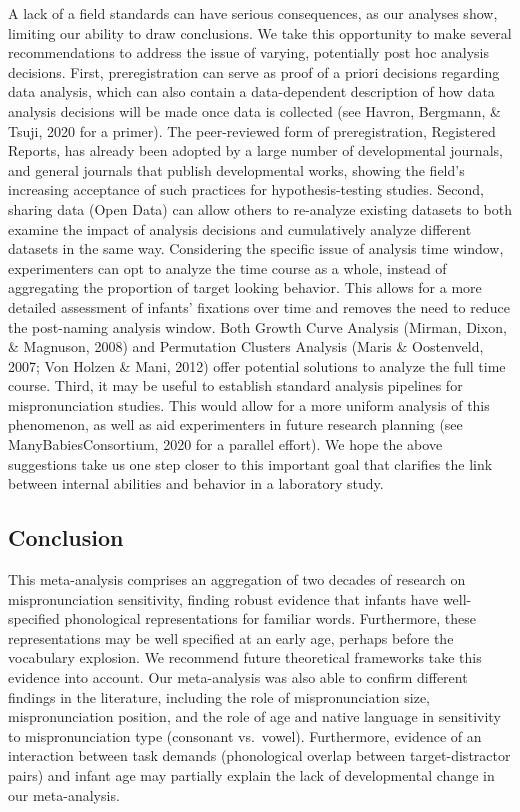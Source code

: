 \documentclass[
  man, noextraspace]{apa6}
\begin{document}
A lack of a field standards can have serious consequences, as our analyses show, limiting our ability to draw conclusions. We take this opportunity to make several recommendations to address the issue of varying, potentially post hoc analysis decisions. First, preregistration can serve as proof of a priori decisions regarding data analysis, which can also contain a data-dependent description of how data analysis decisions will be made once data is collected (see Havron, Bergmann, \& Tsuji, 2020 for a primer). The peer-reviewed form of preregistration, Registered Reports, has already been adopted by a large number of developmental journals, and general journals that publish developmental works, showing the field's increasing acceptance of such practices for hypothesis-testing studies. Second, sharing data (Open Data) can allow others to re-analyze existing datasets to both examine the impact of analysis decisions and cumulatively analyze different datasets in the same way. Considering the specific issue of analysis time window, experimenters can opt to analyze the time course as a whole, instead of aggregating the proportion of target looking behavior. This allows for a more detailed assessment of infants' fixations over time and removes the need to reduce the post-naming analysis window. Both Growth Curve Analysis (Mirman, Dixon, \& Magnuson, 2008) and Permutation Clusters Analysis (Maris \& Oostenveld, 2007; Von Holzen \& Mani, 2012) offer potential solutions to analyze the full time course. Third, it may be useful to establish standard analysis pipelines for mispronunciation studies. This would allow for a more uniform analysis of this phenomenon, as well as aid experimenters in future research planning (see ManyBabiesConsortium, 2020 for a parallel effort). We hope the above suggestions take us one step closer to this important goal that clarifies the link between internal abilities and behavior in a laboratory study.

\hypertarget{conclusion}{%
\subsection{Conclusion}\label{conclusion}}

This meta-analysis comprises an aggregation of two decades of research on mispronunciation sensitivity, finding robust evidence that infants have well-specified phonological representations for familiar words. Furthermore, these representations may be well specified at an early age, perhaps before the vocabulary explosion. We recommend future theoretical frameworks take this evidence into account. Our meta-analysis was also able to confirm different findings in the literature, including the role of mispronunciation size, mispronunciation position, and the role of age and native language in sensitivity to mispronunciation type (consonant vs.~vowel). Furthermore, evidence of an interaction between task demands (phonological overlap between target-distractor pairs) and infant age may partially explain the lack of developmental change in our meta-analysis.
\end{document}

